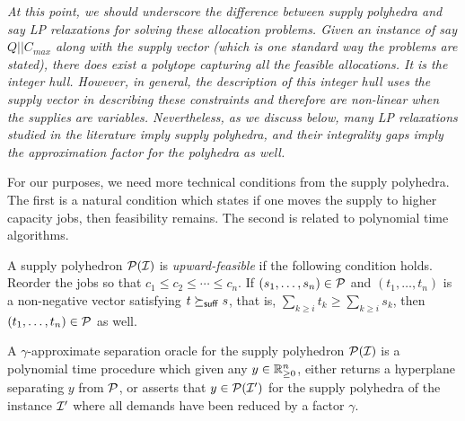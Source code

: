 \begin{remark}\emph{
At this point, we should underscore the difference between supply polyhedra and say LP relaxations for solving  these allocation problems.
Given an instance of say $Q||C_{max}$ {\em along with} the supply vector (which is one standard way the problems are stated), there does exist a polytope capturing all the feasible allocations. It is the integer hull.
However, in general, the description of this integer hull uses the supply vector in describing these constraints and therefore are non-linear when the supplies are variables. Nevertheless, as we discuss below, many LP relaxations
studied in the literature imply supply polyhedra, and their integrality gaps imply the approximation factor for the polyhedra as well.
}
\end{remark}

For our purposes, we need more technical conditions from the supply polyhedra. The first is a natural condition which states if one moves the supply to higher capacity jobs, then feasibility remains.
The second is related to polynomial time algorithms.

\begin{definition}
	A supply polyhedron ${\cal P}({\cal I})$ is {\em upward-feasible} if the following condition holds.
Reorder the jobs so that $c_1\le c_2 \le \cdots \le c_n$.
		If $(s_1,\ldots,s_n)\in {\cal P}$ and $(t_1,\ldots,t_n)$ is a non-negative vector satisfying $t\succeq_{\mathsf{suff}} s$, that is, $\sum_{k\geq i} t_k \geq \sum_{k\geq i} s_k$, then $(t_1,\ldots,t_n)\in {\cal P}$ as well.
\end{definition}
\begin{definition} 
A $\gamma$-approximate separation oracle for the supply polyhedron ${\cal P}({\cal I})$ is a polynomial time procedure which 	given any $y\in \mathbb R^n_{\geq 0}$,  either returns a hyperplane separating $y$ from ${\cal P}$, or asserts that 
		$y\in {\cal P}({\cal I}')$ for the supply polyhedra of the instance ${\cal I}'$ where all demands have been reduced by a factor $\gamma$.
\end{definition}

